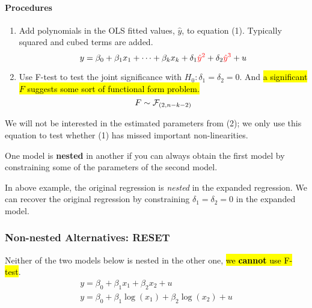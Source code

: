 \documentclass[]{article}
\begin{document}
			\paragraph{Procedures}
			\begin{enumerate}
				\item Add polynomials in the OLS fitted values, $\hat{y}$, to equation (1). Typically squared and cubed terms are added.
					\begin{equation}
						y = \beta_0 + \beta_1 x_1 + \cdots + \beta_k x_k + \delta_1 \textcolor{red}{\hat{y}^2} + \delta_2 \textcolor{red}{\hat{y}^3} + u
					\end{equation}
				\item Use F-test to test the joint significance with $H_0: \delta_1 = \delta_2 = 0$. And \hl{a significant $F$ suggests some sort of functional form problem.}
					\[
						F \sim \mathcal{{F}}_{(2, n-k-2)}
					\]
			\end{enumerate}
			\begin{remark}
				We will not be interested in the estimated parameters from (2); we only use this equation to test whether (1) has missed important non-linearities.
			\end{remark}
			
			
			\begin{remark}
				One model is \textbf{nested} in another if you can always obtain the first model by constraining some of the parameters of the second model.
			\end{remark}
			\begin{example}
				In above example, the original regression is \emph{nested} in the expanded regression. We can recover the original regression by constraining $\delta_1 = \delta_2 = 0$ in the expanded model.
			\end{example}
			
			
		\subsubsection{Non-nested Alternatives: RESET}
			\par Neither of the two models below is nested in the other one, \hl{we \textbf{cannot} use F-test}.
			\begin{gather}
				y = \beta_0 + \beta_1 x_1 + \beta_2 x_2 + u \\
				y = \beta_0 + \beta_1 \log(x_1) + \beta_2 \log(x_2) + u
			\end{gather}
\end{document}
